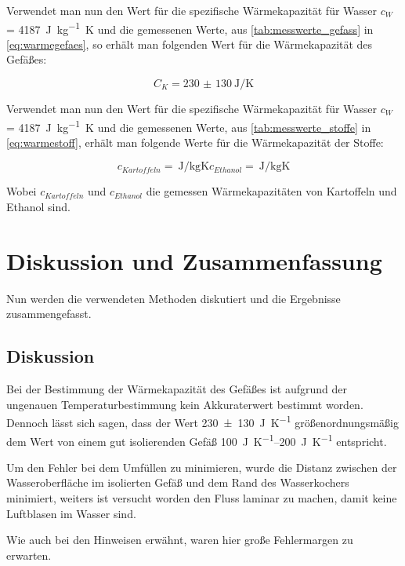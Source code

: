 \documentclass[11pt, ngerman]{scrartcl}
\begin{document}
Verwendet man nun den Wert für die spezifische Wärmekapazität für
Wasser $c_W$ = \SI{4187}{\joule\per\kg\kelvin} \cite{Ahrberg2011}
und die gemessenen Werte, aus \autoref{tab:messwerte_gefass} in \autoref{eq:warmegefaes}, so
erhält man folgenden Wert für die Wärmekapazität des
Gefäßes:

\begin{equation}
	C_K = \SI{230(130)}{\joule\per\kelvin}
\end{equation}

Verwendet man nun den Wert für die spezifische Wärmekapazität für
Wasser $c_W$ = \SI{4187}{\joule\per\kg\kelvin} \cite{Ahrberg2011}
und die gemessenen Werte, aus \autoref{tab:messwerte_stoffe} in \autoref{eq:warmestoff},
erhält man folgende Werte für die Wärmekapazität der
Stoffe:

\begin{equation}
	c_{Kartoffeln}   = \SI{}{\joule\per\kg\kelvin}
	c_{Ethanol} = \SI{}{\joule\per\kg\kelvin}
\end{equation}

Wobei $c_{Kartoffeln}$ und $c_{Ethanol}$ die gemessen
Wärmekapazitäten von Kartoffeln und Ethanol sind.


\section{Diskussion und Zusammenfassung}
\label{sec:diskussion_zusammenfassung}

Nun werden die verwendeten Methoden diskutiert und die Ergebnisse
zusammengefasst.

\subsection{Diskussion}

Bei der Bestimmung der Wärmekapazität des Gefäßes
ist aufgrund der ungenauen Temperaturbestimmung
kein Akkuraterwert bestimmt worden. Dennoch lässt
sich sagen, dass der Wert \SI{230(130)}{\joule\per\kelvin} größenordnungsmäßig
dem Wert von einem gut isolierenden Gefäß \SIrange{100}{200}{\joule\per\kelvin} \cite{wärmehinweise} entspricht.

Um den Fehler bei dem Umfüllen zu minimieren, wurde
die Distanz zwischen der Wasseroberfläche im isolierten
Gefäß und dem Rand des Wasserkochers minimiert, weiters
ist versucht worden den Fluss laminar zu machen, damit
keine Luftblasen im Wasser sind.

Wie auch bei den Hinweisen \cite{wärmehinweise} erwähnt, waren hier
große Fehlermargen zu erwarten.
\end{document}
